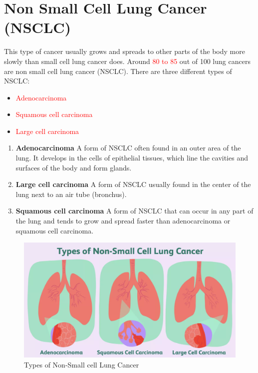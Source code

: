 \section{Non Small Cell Lung Cancer (NSCLC)} 
This type of cancer usually grows and spreads to other parts of the body more slowly than small cell lung cancer does. Around \textcolor{red}{80 to 85} out of 100 lung cancers are non small cell lung cancer (NSCLC). There are three different types of NSCLC:
\begin{outline}
\begin{itemize}
    \item \textcolor{red}{Adenocarcinoma} 
    \item \textcolor{red}{Squamous cell carcinoma}
    \item \textcolor{red}{Large cell carcinoma}
\end{itemize}
\end{outline}

\begin{highlight}
\begin{enumerate}
    \item \textbf{Adenocarcinoma} \cite{zhang2024adenocarcinoma} A form of NSCLC often found in an outer area of the lung. It develops in the cells of epithelial tissues, which line the cavities and surfaces of the body and form glands.

    \item \textbf{Large cell carcinoma} \cite{nguyen2024systematic} A form of NSCLC usually found in the center of the lung next to an air tube (bronchus).

    \item \textbf{Squamous cell carcinoma} \cite{zhang2024immune} A form of NSCLC that can occur in any part of the lung and tends to grow and spread faster than adenocarcinoma or squamous cell carcinoma.
\end{enumerate}
\end{highlight}


\begin{figure}[ht!]
    \centering
    \includegraphics[width=\linewidth]{images/Non_small_cell_lung_cancer.png}
    \caption{Types of Non-Small cell Lung Cancer}
\end{figure}

